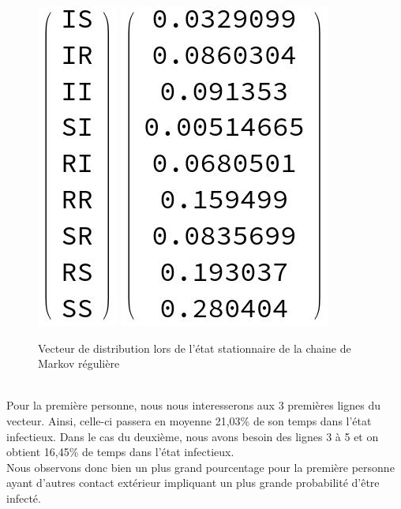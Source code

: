 \documentclass[a4paper, 11pt, oneside]{article}
\begin{document}
\begin{itemize}
\begin{figure}[h]
        \includegraphics[scale=0.55]{ordre_matrice_transitionQ4.jpg}
        \includegraphics[scale=0.55]{vecteurQ5.jpg}
        \caption{Vecteur de distribution lors de l'état stationnaire de la chaine de Markov régulière}
    \end{figure}
    \\Pour la première personne, nous nous interesserons aux 3 premières lignes du 
    vecteur. Ainsi, celle-ci passera en moyenne 21,03\% de son temps dans l'état infectieux.
    Dans le cas du deuxième, nous avons besoin des lignes 3 à 5 et on obtient 16,45\% de temps 
    dans l'état infectieux. 
    \\Nous observons donc bien un plus grand pourcentage 
    pour la première personne ayant d'autres contact extérieur impliquant un 
    plus grande probabilité d'être infecté.

\end{itemize}
\end{document}

